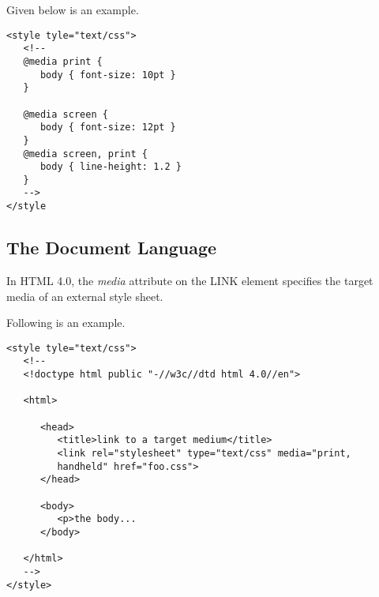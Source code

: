 \documentclass[a4paper,oneside]{book}
\numberwithin{equation}{chapter}
\begin{document}
Given below is an example.
\begin{verbatim}
<style tyle="text/css">
   <!--
   @media print {
      body { font-size: 10pt }
   }
	
   @media screen {
      body { font-size: 12pt }
   }
   @media screen, print {
      body { line-height: 1.2 }
   }
   -->
</style
\end{verbatim}
\subsection{The Document Language}
In HTML 4.0, the \textit{media} attribute on the LINK element specifies the target media of an external style sheet.

Following is an example.
\begin{verbatim}
<style tyle="text/css">
   <!--
   <!doctype html public "-//w3c//dtd html 4.0//en">
	
   <html>
	
      <head>
         <title>link to a target medium</title>
         <link rel="stylesheet" type="text/css" media="print, 
         handheld" href="foo.css">
      </head>
		
      <body>
         <p>the body...
      </body>
		
   </html>
   -->
</style>
\end{verbatim}
\end{document}
